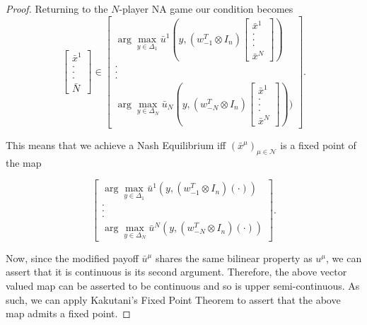 \documentclass{article}
\theoremstyle{definition}
\newcommand{\agentset}{\mathcal{N}}
\newcommand{\NE}[1]{\bar{x}^{#1}}
\begin{document}
\begin{proof}
		Returning to the $N$-player NA game our condition becomes
		\begin{equation}
			\begin{bmatrix}
				\NE{1} \\ . \\ . \\ . \\ \bar{N}
			\end{bmatrix} \in
			\begin{bmatrix}
				\arg\max_{y \in \Delta_1} \bar{u}^1(y, (w_{-1}^T \otimes I_n) \begin{bmatrix}
					\NE{1} \\ . \\ . \\ . \\ \NE{N}
				\end{bmatrix}) \\ . \\ . \\ . \\ \arg\max_{y \in \Delta_N} \bar{u}_N(y, (w_{-N}^T \otimes I_n) \begin{bmatrix}
				\NE{1} \\ . \\ . \\ . \\ \NE{N}
			\end{bmatrix}))
			\end{bmatrix}	.
		\end{equation}

		This means that we achieve a Nash Equilibrium iff $(\NE{\mu})_{\mu \in \agentset}$ is a fixed point of the map
	
	
		\begin{equation}
			\begin{bmatrix}
				\arg\max_{y \in \Delta_1} \bar{u}^1(y, (w_{-1}^T \otimes I_n) ( \cdot )) \\ . \\ . \\ . \\ \arg\max_{y \in \Delta_N} \bar{u}^N(y, (w_{-N}^T \otimes I_n)( \cdot ))
			\end{bmatrix}	.
		\end{equation}


		Now, since the modified payoff $\bar{u}^\mu$ shares the same bilinear property as $u^\mu$, we can assert that it is continuous is its second argument. Therefore, the above vector valued map can be asserted to be continuous and so is upper semi-continuous. As such, we can apply Kakutani's Fixed Point Theorem to assert that the above map admits a fixed point.

	\end{proof}
\end{document}
